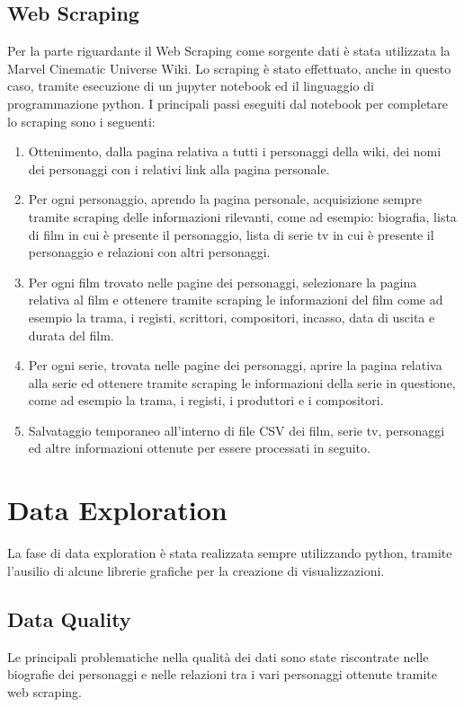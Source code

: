 \documentclass[
12pt, %
a4paper, %
oneside, %
headinclude,footinclude, %
BCOR5mm, %
]{scrartcl}
\begin{document}
\subsection{Web Scraping}
Per la parte riguardante il Web Scraping come sorgente dati è stata utilizzata la Marvel Cinematic Universe Wiki. %
Lo scraping è stato effettuato, anche in questo caso, tramite esecuzione di un jupyter notebook ed il linguaggio di programmazione python.
I principali passi eseguiti dal notebook per completare lo scraping sono i seguenti:
\begin{enumerate}
\item Ottenimento, dalla pagina relativa a tutti i personaggi della wiki, dei nomi dei personaggi con i relativi link alla pagina personale. 
\item Per ogni personaggio, aprendo la pagina personale, acquisizione sempre tramite scraping delle informazioni rilevanti, come ad esempio: biografia, lista di film in cui è presente il personaggio, lista di serie tv in cui è presente il personaggio e relazioni con altri personaggi.
\item Per ogni film trovato nelle pagine dei personaggi, selezionare la pagina relativa al film e ottenere tramite scraping le informazioni del film come ad esempio la trama, i registi, scrittori, compositori, incasso, data di uscita e durata del film.
\item Per ogni serie, trovata nelle pagine dei personaggi, aprire la pagina relativa alla serie ed ottenere tramite scraping le informazioni della serie in questione, come ad esempio la trama, i registi, i produttori e i compositori.
\item Salvataggio temporaneo all'interno di file CSV dei film, serie tv, personaggi ed altre informazioni ottenute per essere processati in seguito.
\end{enumerate}

\section{Data Exploration}
La fase di data exploration è stata realizzata sempre utilizzando python, tramite l'ausilio di alcune librerie grafiche per la creazione di visualizzazioni.

\subsection{Data Quality}
Le principali problematiche nella qualità dei dati sono state riscontrate nelle biografie dei personaggi e nelle relazioni tra i vari personaggi ottenute tramite web scraping.
\end{document}
